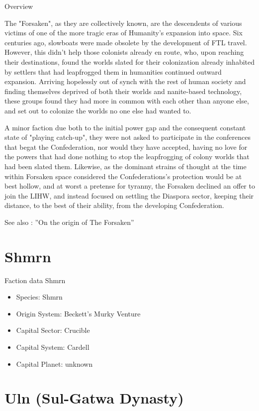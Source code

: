 Overview 

The "Forsaken", as they are collectively known, are the
descendents of various victims of one of the more tragic eras of
Humanity's expansion into space. Six centuries ago, slowboats were
made obsolete by the development of FTL travel. However, this didn't
help those colonists already en route, who, upon reaching their
destinations, found the worlds slated for their colonization already
inhabited by settlers that had leapfrogged them in humanities
continued outward expansion. Arriving hopelessly out of synch with the
rest of human society and finding themselves deprived of both their
worlds and nanite-based technology, these groups found they had more
in common with each other than anyone else, and set out to colonize
the worlds no one else had wanted to.

A minor faction due both to the initial power gap and the consequent
constant state of "playing catch-up", they were not asked to
participate in the conferences that begat the Confederation, nor would
they have accepted, having no love for the powers that had done
nothing to stop the leapfrogging of colony worlds that had been slated
them. Likewise, as the dominant strains of thought at the time within
Forsaken space considered the Confederations's protection would be at
best hollow, and at worst a pretense for tyranny, the Forsaken
declined an offer to join the LIHW, and instead focused on settling
the Diaspora sector, keeping their distance, to the best of their
ability, from the developing Confederation.
 
See also : ''On the origin of The Forsaken'' 

\section{Shmrn}

Faction data Shmrn
\begin{itemize}
\item Species: Shmrn
\item Origin System: Beckett's Murky Venture 
\item Capital Sector: Crucible
\item Capital System: Cardell
\item Capital Planet: unknown
\end{itemize}

\section{Uln (Sul-Gatwa Dynasty)}


